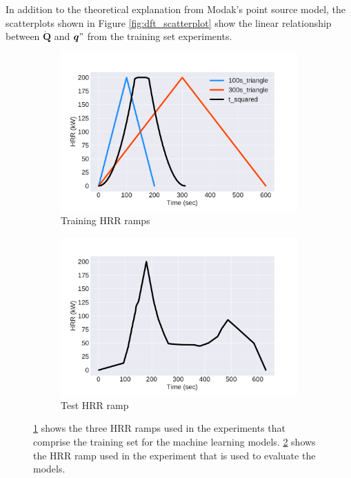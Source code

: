\documentclass{article}
\begin{document}
In addition to the theoretical explanation from Modak's point source model, the scatterplots shown in Figure \ref{fig:dft_scatterplot} show the linear relationship between $\boldsymbol{\dot{Q}}$ and $\boldsymbol{q}"$ from the training set experiments. 




\begin{figure}[htbp]
  \centering
  \begin{subfigure}[t]{.45\textwidth}
      \centering
      \includegraphics[width=\textwidth,keepaspectratio]{figures/training_ramps.pdf}
      \caption{Training HRR ramps}
      \label{fig:training_ramps}
  \end{subfigure}
  \begin{subfigure}[t]{.45\textwidth}
      \centering
      \includegraphics[width=\textwidth ,keepaspectratio]{figures/test_ramp.pdf}
      \caption{Test HRR ramp}
      \label{fig:test_ramp}
  \end{subfigure}
  \caption{\protect\ref{fig:training_ramps} shows the three HRR ramps used in the experiments that comprise the training set for the machine learning models. \protect\ref{fig:test_ramp} shows the HRR ramp used in the experiment that is used to evaluate the models.}
  \label{fig:hrr_ramps}
\end{figure}





\clearpage


\end{document}
